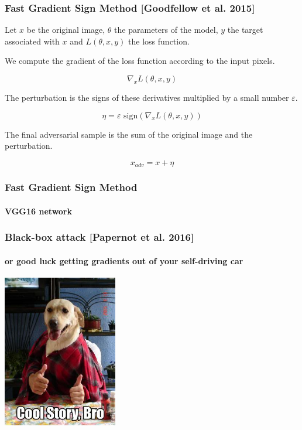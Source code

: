 \documentclass[9pt]{beamer}
\begin{document}
\begin{frame}
  \frametitle{Fast Gradient Sign Method [Goodfellow et al. 2015]}

  Let $x$ be the original image, $\theta$ the parameters of the model,
  $y$ the target associated with $x$ and $L(\theta, x, y)$ the loss
  function.

  \bigskip

  We compute the gradient of the loss function according to the input
  pixels.

  \[
  \nabla_{x} L(\theta, x, y)
  \]

  \bigskip

  The perturbation is the signs of these derivatives multiplied by a
  small number $\varepsilon$.

  \[
  \eta = \varepsilon \text{ sign}(\nabla_{x} L(\theta, x, y))
  \]

  \bigskip

  The final adversarial sample is the sum of the original image and
  the perturbation.

  \[
  x_{adv} = x + \eta
  \]

\end{frame}

\begin{frame}
  \frametitle{Fast Gradient Sign Method}

  \framesubtitle{\textbf{VGG16} network}

  \begin{center}
    
  \end{center}
\end{frame}

\begin{frame}
  \frametitle{Black-box attack [Papernot et al. 2016]}

  \framesubtitle{or good luck getting gradients out of your
    self-driving car}

  \begin{center}
    \includegraphics[width = 5cm]{images/cool_story_bro_1.jpg}
  \end{center}

\end{frame}
\end{document}
